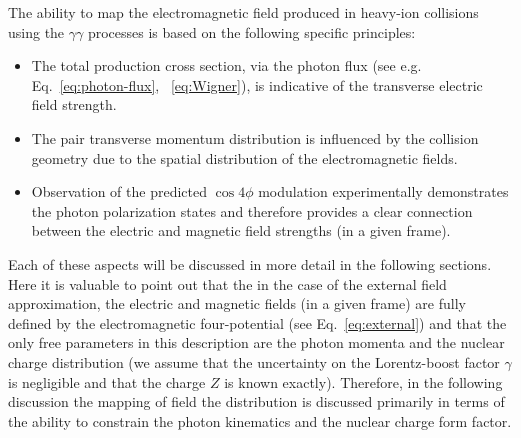\documentclass[twocolumn,epjc3]{svjour3}\sloppy
\begin{document}
The ability to map the electromagnetic field produced in heavy-ion collisions using the $\gamma\gamma$ processes is based on the following specific principles:
\begin{itemize}
  \item The total production cross section, via the photon flux (see e.g. Eq.~\ref{eq:photon-flux}, ~\ref{eq:Wigner}), is indicative of the transverse electric field strength.
  \item The pair transverse momentum distribution is influenced by the collision geometry due to the spatial distribution of the electromagnetic fields. 
  \item Observation of the predicted $\cos4\phi$ modulation experimentally demonstrates the photon polarization states and therefore provides a clear connection between the electric and magnetic field strengths (in a given frame).
\end{itemize}

Each of these aspects will be discussed in more detail in the following sections. Here it is valuable to point out that the in the case of the external field approximation, the electric and magnetic fields (in a given frame) are fully defined by the electromagnetic four-potential (see Eq.~\ref{eq:external}) and that the only free parameters in this description are the photon momenta and the nuclear charge distribution (we assume that the uncertainty on the Lorentz-boost factor $\gamma$ is negligible and that the charge $Z$ is known exactly). Therefore, in the following discussion the mapping of field the distribution is discussed primarily in terms of the ability to constrain the photon kinematics and the nuclear charge form factor. 
\end{document}
